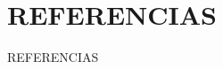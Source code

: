\documentclass[pdftex,spanish]{beamer}
\begin{document}


\section{REFERENCIAS}
\begin{frame}[allowframebreaks]{REFERENCIAS}

\renewcommand{\bibname}{REFERENCIAS}
 
\end{frame}
\end{document}
